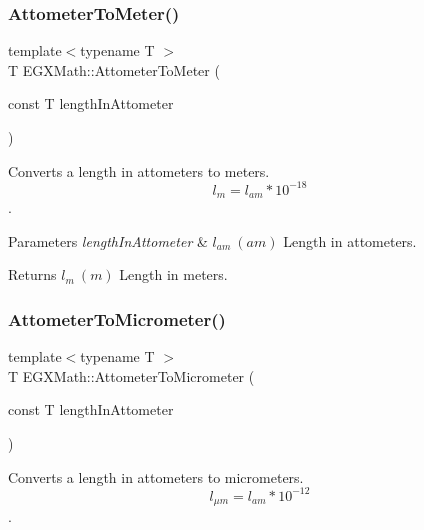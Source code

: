 \subsubsection{\texorpdfstring{Attometer\+To\+Meter()}{AttometerToMeter()}}
{\footnotesize\ttfamily template$<$typename T $>$ \\
T E\+G\+X\+Math\+::\+Attometer\+To\+Meter (\begin{DoxyParamCaption}\item[{const T}]{length\+In\+Attometer }\end{DoxyParamCaption})}



Converts a length in attometers to meters. \[ l_{m}=l_{am}* 10^{-18} \]. 


\begin{DoxyParams}{Parameters}
{\em length\+In\+Attometer} & $ l_{am}\ (am)$ Length in attometers. \\
\hline
\end{DoxyParams}
\begin{DoxyReturn}{Returns}
$ l_{m}\ (m)$ Length in meters. 
\end{DoxyReturn}
\mbox{\label{group___e_g_x_math-_conversions-_length_conversions-_attometer-_s_i_gaa98a14657ea865a6cac8fb8fc42172a2}} 
\subsubsection{\texorpdfstring{Attometer\+To\+Micrometer()}{AttometerToMicrometer()}}
{\footnotesize\ttfamily template$<$typename T $>$ \\
T E\+G\+X\+Math\+::\+Attometer\+To\+Micrometer (\begin{DoxyParamCaption}\item[{const T}]{length\+In\+Attometer }\end{DoxyParamCaption})}



Converts a length in attometers to micrometers. \[ l_{\mu m}=l_{am} * 10^{-12} \]. 

